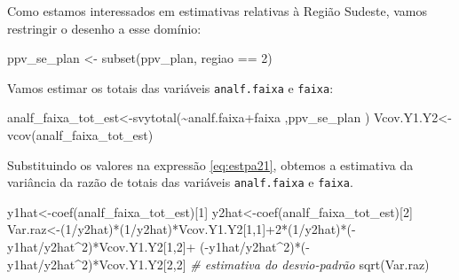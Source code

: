 \documentclass[
  12pt,
  brazilian,
]{book}
\newenvironment{Shaded}{\begin{snugshade}}{\end{snugshade}}
\newcommand{\CommentTok}[1]{\textcolor[rgb]{0.56,0.35,0.01}{\textit{#1}}}
\newcommand{\DecValTok}[1]{\textcolor[rgb]{0.00,0.00,0.81}{#1}}
\newcommand{\FunctionTok}[1]{\textcolor[rgb]{0.00,0.00,0.00}{#1}}
\newcommand{\NormalTok}[1]{#1}
\newcommand{\OtherTok}[1]{\textcolor[rgb]{0.56,0.35,0.01}{#1}}
\newcommand{\SpecialCharTok}[1]{\textcolor[rgb]{0.00,0.00,0.00}{#1}}
\theoremstyle{definition}
\theoremstyle{definition}
\theoremstyle{definition}
\theoremstyle{definition}
\theoremstyle{remark}
\begin{document}
Como estamos interessados em estimativas relativas à Região Sudeste, vamos restringir o desenho a esse domínio:

\begin{Shaded}
\begin{Highlighting}[]
\NormalTok{ppv\_se\_plan }\OtherTok{\textless{}{-}} \FunctionTok{subset}\NormalTok{(ppv\_plan, regiao }\SpecialCharTok{==} \DecValTok{2}\NormalTok{)}
\end{Highlighting}
\end{Shaded}

Vamos estimar os totais das variáveis \texttt{analf.faixa} e \texttt{faixa}:

\begin{Shaded}
\begin{Highlighting}[]
\NormalTok{analf\_faixa\_tot\_est}\OtherTok{\textless{}{-}}\FunctionTok{svytotal}\NormalTok{(}\SpecialCharTok{\textasciitilde{}}\NormalTok{analf.faixa}\SpecialCharTok{+}\NormalTok{faixa ,ppv\_se\_plan )}
\NormalTok{Vcov.Y1.Y2}\OtherTok{\textless{}{-}}\FunctionTok{vcov}\NormalTok{(analf\_faixa\_tot\_est) }
\end{Highlighting}
\end{Shaded}

Substituindo os valores na expressão \eqref{eq:estpa21}, obtemos a estimativa da variância da razão de totais das variáveis \texttt{analf.faixa} e \texttt{faixa}.

\begin{Shaded}
\begin{Highlighting}[]
\NormalTok{y1hat}\OtherTok{\textless{}{-}}\FunctionTok{coef}\NormalTok{(analf\_faixa\_tot\_est)[}\DecValTok{1}\NormalTok{]}
\NormalTok{y2hat}\OtherTok{\textless{}{-}}\FunctionTok{coef}\NormalTok{(analf\_faixa\_tot\_est)[}\DecValTok{2}\NormalTok{]}
\NormalTok{Var.raz}\OtherTok{\textless{}{-}}\NormalTok{(}\DecValTok{1}\SpecialCharTok{/}\NormalTok{y2hat)}\SpecialCharTok{*}\NormalTok{(}\DecValTok{1}\SpecialCharTok{/}\NormalTok{y2hat)}\SpecialCharTok{*}\NormalTok{Vcov.Y1.Y2[}\DecValTok{1}\NormalTok{,}\DecValTok{1}\NormalTok{]}\SpecialCharTok{+}\DecValTok{2}\SpecialCharTok{*}\NormalTok{(}\DecValTok{1}\SpecialCharTok{/}\NormalTok{y2hat)}\SpecialCharTok{*}\NormalTok{(}\SpecialCharTok{{-}}\NormalTok{y1hat}\SpecialCharTok{/}\NormalTok{y2hat}\SpecialCharTok{\^{}}\DecValTok{2}\NormalTok{)}\SpecialCharTok{*}\NormalTok{Vcov.Y1.Y2[}\DecValTok{1}\NormalTok{,}\DecValTok{2}\NormalTok{]}\SpecialCharTok{+}
\NormalTok{(}\SpecialCharTok{{-}}\NormalTok{y1hat}\SpecialCharTok{/}\NormalTok{y2hat}\SpecialCharTok{\^{}}\DecValTok{2}\NormalTok{)}\SpecialCharTok{*}\NormalTok{(}\SpecialCharTok{{-}}\NormalTok{y1hat}\SpecialCharTok{/}\NormalTok{y2hat}\SpecialCharTok{\^{}}\DecValTok{2}\NormalTok{)}\SpecialCharTok{*}\NormalTok{Vcov.Y1.Y2[}\DecValTok{2}\NormalTok{,}\DecValTok{2}\NormalTok{]}
\CommentTok{\# estimativa do desvio{-}padrão}
\FunctionTok{sqrt}\NormalTok{(Var.raz)}
\end{Highlighting}
\end{Shaded}
\end{document}
